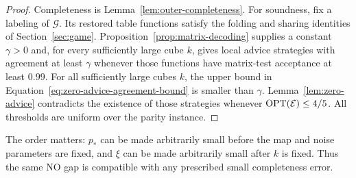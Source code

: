 \begin{proof}
Completeness is Lemma~\ref{lem:outer-completeness}.  For soundness,
fix a labeling of $\mathcal G$.  Its restored table functions satisfy
the folding and sharing identities of Section~\ref{sec:game}.
Proposition~\ref{prop:matrix-decoding} supplies a constant $\gamma>0$
and, for every sufficiently large cube $k$, gives local advice
strategies with agreement at least $\gamma$ whenever those functions
have matrix-test acceptance at least $0.99$.  For all sufficiently large
cubes $k$, the upper
bound in Equation~\eqref{eq:zero-advice-agreement-bound} is smaller than
$\gamma$.
Lemma~\ref{lem:zero-advice} contradicts the existence of those strategies
whenever $\operatorname{OPT}(\mathcal E)\le4/5$.  All thresholds are uniform over
the parity instance.
\end{proof}

The order matters: $p_*$ can be made arbitrarily small before the
map and noise parameters are fixed, and $\xi$ can be made arbitrarily small
after $k$ is fixed.  Thus the same NO gap is compatible with any
prescribed small completeness error.
